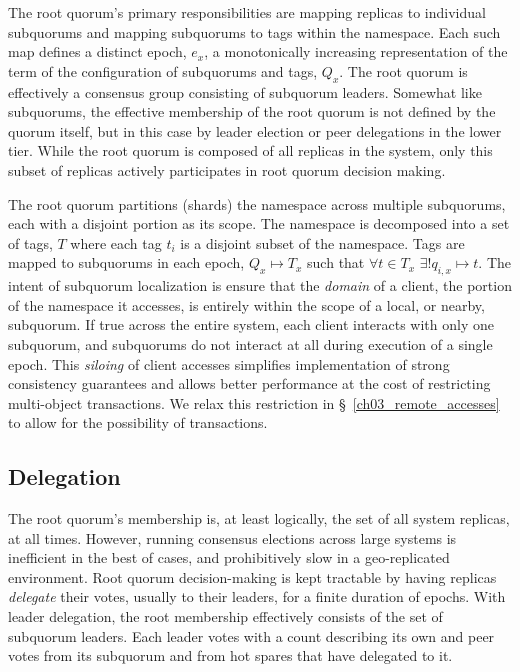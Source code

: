 The root quorum's primary responsibilities are mapping replicas to individual subquorums and mapping subquorums to tags within the namespace.
Each such map defines a distinct epoch, $e_x$, a monotonically increasing representation of the term of the configuration of subquorums and tags, $Q_x$.
The root quorum is effectively a consensus group consisting of subquorum leaders.
Somewhat like subquorums, the effective membership of the root quorum is not defined by the quorum itself, but in this case by leader election or peer delegations in the lower tier.
While the root quorum is composed of all replicas in the system, only this subset of replicas actively participates in root quorum decision making.

The root quorum partitions (shards) the namespace across multiple subquorums, each with a disjoint portion as its scope.
The namespace is decomposed into a set of tags, $T$ where each tag $t_i$ is a disjoint subset of the namespace.
Tags are mapped to subquorums in each epoch, $Q_x \mapsto T_x$ such that $\forall t \in T_x$ $\exists! q_{i,x} \mapsto t$.
The intent of subquorum localization is ensure that the \emph{domain} of a client, the portion of the namespace it accesses, is entirely within the scope of a local, or nearby, subquorum.
If true across the entire system, each client interacts with only one subquorum, and subquorums do not interact at all during execution of a single epoch.
This \emph{siloing} of client accesses simplifies implementation of strong consistency guarantees and allows better performance at the cost of restricting multi-object transactions.
We relax this restriction in \S~\ref{ch03_remote_accesses} to allow for the possibility of transactions.

\subsection{Delegation}
\label{ch03_delegation}

The root quorum's membership is, at least logically, the set of all system replicas, at all times.
However, running consensus elections across large systems is inefficient in the best of cases, and prohibitively slow in a geo-replicated environment.
Root quorum decision-making is kept tractable by having replicas \emph{delegate} their votes, usually to their leaders, for a finite duration of epochs.
With leader delegation, the root membership effectively consists of the set of subquorum leaders.
Each leader votes with a count describing its own and peer votes from its
subquorum and from hot spares that have delegated to it.

